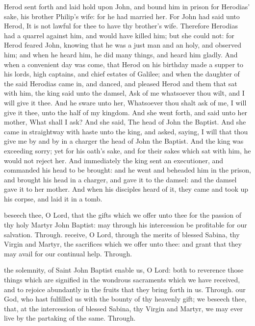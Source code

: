  Herod sent forth and laid hold upon John, and bound him in prison for Herodias' sake, his brother Philip’s wife: for he had married her. For John had said unto Herod, It is not lawful for thee to have thy brother’s wife. Therefore Herodias had a quarrel against him, and would have killed him; but she could not: for Herod feared John, knowing that he was a just man and an holy, and observed him; and when he heard him, he did many things, and heard him gladly. And when a convenient day was come, that Herod on his birthday made a supper to his lords, high captains, and chief estates of Galilee; and when the daughter of the said Herodias came in, and danced, and pleased Herod and them that sat with him, the king said unto the damsel, Ask of me whatsoever thou wilt, and I will give it thee. And he sware unto her, Whatsoever thou shalt ask of me, I will give it thee, unto the half of my kingdom. And she went forth, and said unto her mother, What shall I ask? And she said, The head of John the Baptist. And she came in straightway with haste unto the king, and asked, saying, I will that thou give me by and by in a charger the head of John the Baptist. And the king was exceeding sorry; yet for his oath’s sake, and for their sakes which sat with him, he would not reject her. And immediately the king sent an executioner, and commanded his head to be brought: and he went and beheaded him in the prison, and brought his head in a charger, and gave it to the damsel: and the damsel gave it to her mother. And when his disciples heard of it, they came and took up his corpse, and laid it in a tomb.


\secret
{} beseech thee, O Lord, that the gifts which we offer unto thee for the passion of thy holy Martyr John Baptist: may through his intercession be profitable for our salvation. Through.
 receive, O Lord, through the merits of blessed Sabina, thy Virgin and Martyr, the sacrifices which we offer unto thee: and grant that they may avail for our continual help. Through.


\postcommunion
{} the solemnity, of Saint John Baptist enable us, O Lord: both to reverence those things which are signified in the wondrous sacraments which we have received, and to rejoice abundantly in the fruits that they bring forth in us. Through.
 our God, who hast fulfilled us with the bounty of thy heavenly gift; we beseech thee, that, at the intercession of blessed Sabina, thy Virgin and Martyr, we may ever live by the partaking of the same. Through.


